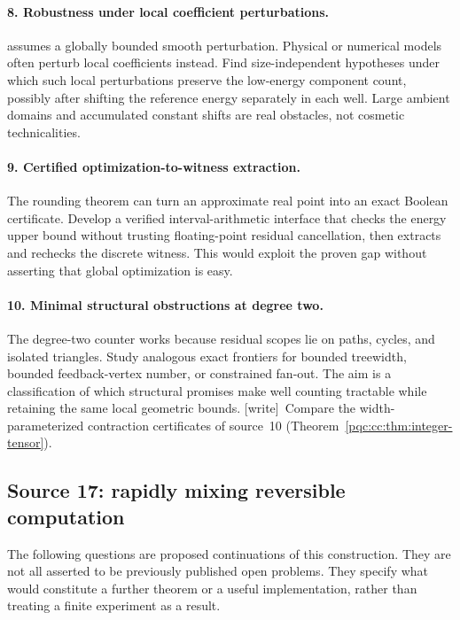 \documentclass[11pt,letterpaper]{article}
\numberwithin{equation}{section}
\theoremstyle{definition}
\theoremstyle{remark}
\newcommand{\wtag}{\textup{[write]}}
\begin{document}
\paragraph{8. Robustness under local coefficient perturbations.}
 assumes a globally bounded smooth perturbation. Physical
or numerical models often perturb local coefficients instead. Find
size-independent hypotheses under which such local perturbations preserve
the low-energy component count, possibly after shifting the reference
energy separately in each well. Large ambient domains and accumulated
constant shifts are real obstacles, not cosmetic technicalities.

\paragraph{9. Certified optimization-to-witness extraction.}
The rounding theorem can turn an approximate real point into an exact
Boolean certificate. Develop a verified interval-arithmetic interface
that checks the energy upper bound without trusting floating-point
residual cancellation, then extracts and rechecks the discrete witness.
This would exploit the proven gap without asserting that global
optimization is easy.

\paragraph{10. Minimal structural obstructions at degree two.}
The degree-two counter works because residual scopes lie on paths,
cycles, and isolated triangles. Study analogous exact frontiers for
bounded treewidth, bounded feedback-vertex number, or constrained
fan-out. The aim is a classification of which structural promises make
well counting tractable while retaining the same local geometric bounds. \wtag\ Compare the width-parameterized contraction certificates of source~10 (Theorem~\ref{pqc:cc:thm:integer-tensor}).

\subsection{Source 17: rapidly mixing reversible computation}
\label{pqc:rv:sec:questions}
The following questions are proposed continuations of this construction.
They are not all asserted to be previously published open problems.
They specify what would constitute a further theorem or a useful
implementation, rather than treating a finite experiment as a result.
\end{document}
